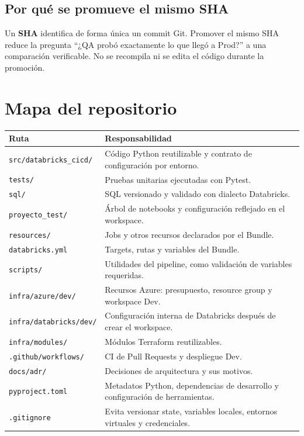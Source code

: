 \documentclass[11pt,a4paper]{article}
\newcommand{\concepto}[1]{\textcolor{dbblue}{\textbf{#1}}}
\begin{document}
\subsection{Por qué se promueve el mismo SHA}

Un \concepto{SHA} identifica de forma única un commit Git. Promover el mismo SHA reduce la pregunta
``¿QA probó exactamente lo que llegó a Prod?'' a una comparación verificable. No se recompila ni se
edita el código durante la promoción.

\section{Mapa del repositorio}

\begin{longtable}{p{}p{}}
\toprule
\textbf{Ruta} & \textbf{Responsabilidad} \\
\midrule
\endhead
\texttt{src/databricks\_cicd/} & Código Python reutilizable y contrato de configuración por entorno. \\
\texttt{tests/} & Pruebas unitarias ejecutadas con Pytest. \\
\texttt{sql/} & SQL versionado y validado con dialecto Databricks. \\
\texttt{proyecto\_test/} & Árbol de notebooks y configuración reflejado en el workspace. \\
\texttt{resources/} & Jobs y otros recursos declarados por el Bundle. \\
\texttt{databricks.yml} & Targets, rutas y variables del Bundle. \\
\texttt{scripts/} & Utilidades del pipeline, como validación de variables requeridas. \\
\texttt{infra/azure/dev/} & Recursos Azure: presupuesto, resource group y workspace Dev. \\
\texttt{infra/databricks/dev/} & Configuración interna de Databricks después de crear el workspace. \\
\texttt{infra/modules/} & Módulos Terraform reutilizables. \\
\texttt{.github/workflows/} & CI de Pull Requests y despliegue Dev. \\
\texttt{docs/adr/} & Decisiones de arquitectura y sus motivos. \\
\texttt{pyproject.toml} & Metadatos Python, dependencias de desarrollo y configuración de herramientas. \\
\texttt{.gitignore} & Evita versionar state, variables locales, entornos virtuales y credenciales. \\
\bottomrule
\end{longtable}
\end{document}
